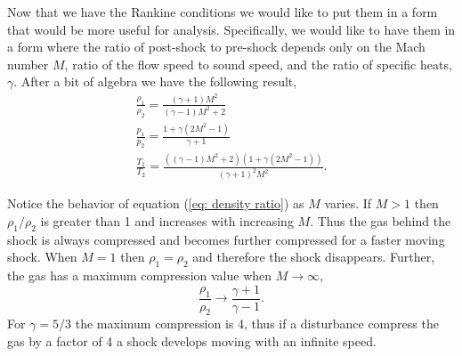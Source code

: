 \documentclass{article}
\begin{document}
Now that we have the Rankine conditions we would like to put them in a form that would be more useful for analysis. Specifically, we would like to have them in a form where the ratio of post-shock to pre-shock depends only on the Mach number $M$, ratio of the flow speed to sound speed, and the ratio of specific heats, $\gamma$. After a bit of algebra we have the following result,
\begin{gather}
\label{eq: density ratio}
\frac{\rho_1}{\rho_2}  = \frac{\left(\gamma+1\right)M^2}{\left(\gamma-1\right)M^2+2}\\
\label{eq: momentum ratio}
\frac{p_1}{p_2} = \frac{1+\gamma\left(2 M^2-1\right)}{\gamma+1}\\
\label{eq: temperature ratio}
\frac{T_1}{T_2} = \frac{\left(\left(\gamma-1\right)M^2+2\right)\left(1+\gamma\left(2M^2-1\right)\right)}{\left(\gamma+1\right)^2M^2}.
\end{gather}

Notice the behavior of equation (\ref{eq: density ratio}) as $M$ varies. If $M >1$ then $\rho_1/\rho_2$ is greater than 1 and increases with increasing $M$. Thus the gas behind the shock is always compressed and becomes further compressed for a faster moving shock. When $M = 1$ then $\rho_1 = \rho_2$ and therefore the shock disappears. Further, the gas has a maximum compression value when $M\rightarrow\infty$,
\begin{equation}
\label{eq: density ratio limit}
\frac{\rho_1}{\rho_2} \rightarrow \frac{\gamma + 1}{\gamma - 1}.
\end{equation}
For $\gamma = 5/3$ the maximum compression is 4, thus if a disturbance compress the gas by a factor of 4 a shock develops moving with an infinite speed.
\end{document}
